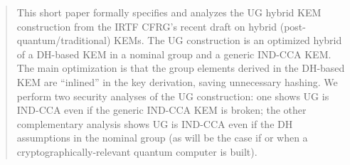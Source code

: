 \begin{abstract}
    This short paper formally specifies and analyzes the UG hybrid KEM construction from the IRTF CFRG's recent draft on hybrid (post-quantum/traditional) KEMs. The UG construction is an optimized hybrid of a DH-based KEM in a nominal group and a generic IND-CCA KEM. The main optimization is that the group elements derived in the DH-based KEM are ``inlined'' in the key derivation, saving unnecessary hashing. We perform two security analyses of the UG construction: one shows UG is IND-CCA even if the generic IND-CCA KEM is broken; the other complementary analysis shows UG is IND-CCA even if the DH assumptions in the nominal group (as will be the case if or when a cryptographically-relevant quantum computer is built).
\end{abstract}
